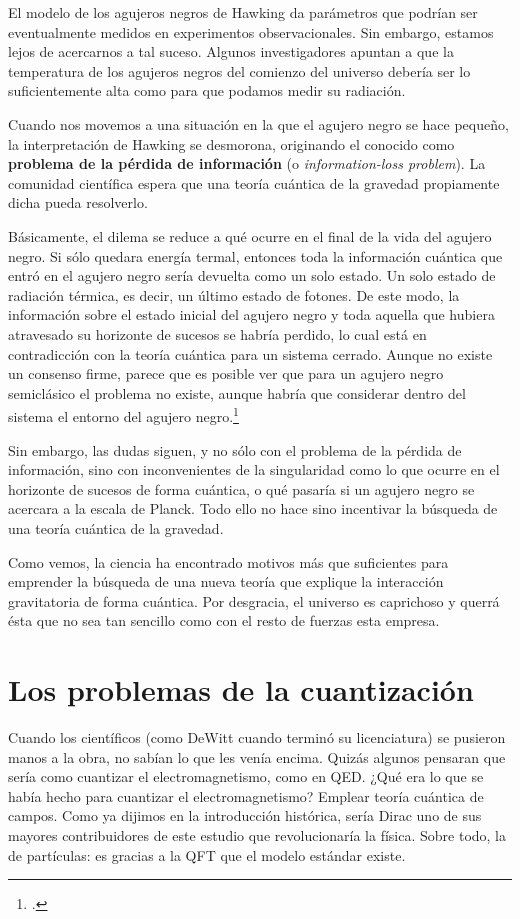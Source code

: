\documentclass[11pt,a4paper,titlepage]{article}
\begin{document}
\begin{description}
{  El modelo de los agujeros negros de Hawking da parámetros que podrían ser eventualmente medidos en experimentos observacionales. Sin embargo, estamos lejos de acercarnos a tal suceso. Algunos investigadores apuntan a que la temperatura de los agujeros negros del comienzo del universo debería ser lo suficientemente alta como para que podamos medir su radiación.

  Cuando nos movemos a una situación en la que el agujero negro se hace pequeño, la interpretación de Hawking se desmorona, originando el conocido como \textbf{problema de la pérdida de información} (o \textit{information-loss problem}). La comunidad científica espera que una teoría cuántica de la gravedad propiamente dicha pueda resolverlo.

  Básicamente, el dilema se reduce a qué ocurre en el final de la vida del agujero negro. Si sólo quedara energía termal, entonces toda la información cuántica que entró en el agujero negro sería devuelta como un solo estado. Un solo estado de radiación térmica, es decir, un último estado de fotones. De este modo, la información sobre el estado inicial del agujero negro y toda aquella que hubiera atravesado su horizonte de sucesos se habría perdido, lo cual está en contradicción con la teoría cuántica para un sistema cerrado. Aunque no existe un consenso firme, parece que es posible ver que para un agujero negro semiclásico el problema no existe, aunque habría que considerar dentro del sistema el entorno del agujero negro.\footnote{\cite[p.~4]{paper_osorio}.}

  Sin embargo, las dudas siguen, y no sólo con el problema de la pérdida de información, sino con inconvenientes de la singularidad como lo que ocurre en el horizonte de sucesos de forma cuántica, o qué pasaría si un agujero negro se acercara a la escala de Planck. Todo ello no hace sino incentivar la búsqueda de una teoría cuántica de la gravedad.}

\end{description}

Como vemos, la ciencia ha encontrado motivos más que suficientes para emprender la búsqueda de una nueva teoría que explique la interacción gravitatoria de forma cuántica. Por desgracia, el universo es caprichoso y querrá ésta que no sea tan sencillo como con el resto de fuerzas esta empresa.
%
%
%
%
\newpage
\section{Los problemas de la cuantización}
Cuando los científicos (como DeWitt cuando terminó su licenciatura) se pusieron manos a la obra, no sabían lo que les venía encima. Quizás algunos pensaran que sería como cuantizar el electromagnetismo, como en QED. ¿Qué era lo que se había hecho para cuantizar el electromagnetismo? Emplear teoría cuántica de campos. Como ya dijimos en la introducción histórica, sería Dirac uno de sus mayores contribuidores de este estudio que revolucionaría la física. Sobre todo, la de partículas: es gracias a la QFT que el modelo estándar existe.
\end{document}
